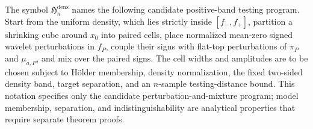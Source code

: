 The symbol \(\mathfrak H_n^{\mathrm{dens}}\) names the following candidate
positive-band testing program.  Start from the uniform density, which lies
strictly inside \([f_{-},f_{+}]\), partition a shrinking cube around \(x_0\)
into paired cells, place normalized mean-zero signed wavelet perturbations in
\(f_P\), couple their signs with flat-top perturbations of \(\pi_P\) and
\(\mu_{a,P}\), and mix over the paired signs.  The cell widths and amplitudes
are to be chosen subject to H\"older membership, density normalization, the
fixed two-sided density band, target separation, and an \(n\)-sample testing-distance
bound.  This notation specifies only the candidate perturbation-and-mixture
program; model membership, separation, and indistinguishability are analytical
properties that require separate theorem proofs.